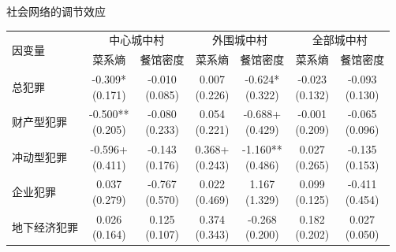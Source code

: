 \documentclass[aspectratio=169,10pt]{ctexbeamer}
\begin{document}
\begin{frame}[plain]{社会网络的调节效应}
  \centering
  \tiny
  \begin{adjustbox}{width=\textwidth}
  \begin{tabular}{lcccccc}
    \toprule
    \multirow{2}{*}{因变量} & \multicolumn{2}{c}{中心城中村} & \multicolumn{2}{c}{外围城中村} & \multicolumn{2}{c}{全部城中村} \\
    \cmidrule(lr){2-3}\cmidrule(lr){4-5}\cmidrule(lr){6-7}
     & 菜系熵 & 餐馆密度 & 菜系熵 & 餐馆密度 & 菜系熵 & 餐馆密度 \\
    \midrule
    总犯罪 & \makecell{-0.309*\\(0.171)} & \makecell{-0.010\\(0.085)} & \makecell{0.007\\(0.226)} & \makecell{-0.624*\\(0.322)} & \makecell{-0.023\\(0.132)} & \makecell{-0.093\\(0.130)} \\
    财产型犯罪 & \makecell{-0.500**\\(0.205)} & \makecell{-0.080\\(0.233)} & \makecell{0.054\\(0.221)} & \makecell{-0.688+\\(0.429)} & \makecell{-0.001\\(0.209)} & \makecell{-0.065\\(0.096)} \\
    冲动型犯罪 & \makecell{-0.596+\\(0.411)} & \makecell{-0.143\\(0.176)} & \makecell{0.368+\\(0.243)} & \makecell{-1.160**\\(0.486)} & \makecell{0.027\\(0.265)} & \makecell{-0.135\\(0.153)} \\
    企业犯罪 & \makecell{0.037\\(0.279)} & \makecell{-0.767\\(0.570)} & \makecell{0.022\\(0.469)} & \makecell{1.167\\(1.329)} & \makecell{0.099\\(0.125)} & \makecell{-0.411\\(0.454)} \\
    地下经济犯罪 & \makecell{0.026\\(0.164)} & \makecell{0.125\\(0.107)} & \makecell{0.374\\(0.343)} & \makecell{-0.268\\(0.200)} & \makecell{0.182\\(0.202)} & \makecell{0.027\\(0.050)} \\
    \bottomrule
  \end{tabular}
  \end{adjustbox}
  

\end{frame}
\end{document}
